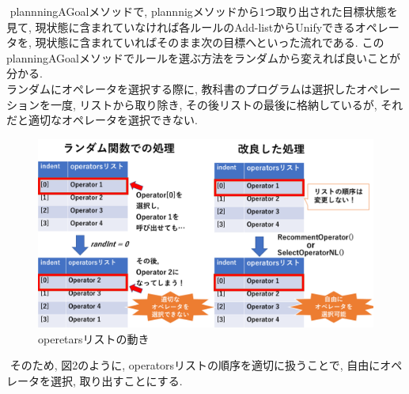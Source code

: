 \documentclass[uplatex,12pt]{jsarticle}
\begin{document}
​
plannningAGoalメソッドで, plannnigメソッドから1つ取り出された目標状態を見て, 現状態に含まれていなければ各ルールのAdd-listからUnifyできるオペレータを,  現状態に含まれていればそのまま次の目標へといった流れである. このplanningAGoalメソッドでルールを選ぶ方法をランダムから変えれば良いことが分かる.\\
​
ランダムにオペレータを選択する際に, 教科書のプログラムは選択したオペレーションを一度, リストから取り除き, その後リストの最後に格納しているが, それだと適切なオペレータを選択できない.
​
\begin{figure}[htbp]
 \begin{center}
  \includegraphics[width = 12cm, pagebox = cropbox, clip]{images/random.pdf}
 \end{center}
 \caption[]{operetarsリストの動き}\label{fig:fig1.1}
\end{figure}
​
そのため, 図2のように, operatorsリストの順序を適切に扱うことで, 自由にオペレータを選択, 取り出すことにする.
​
​
\end{document}
